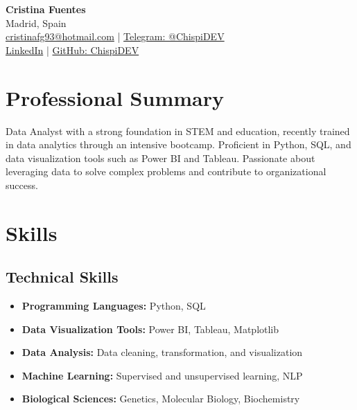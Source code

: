 \documentclass[11pt,a4paper]{article}
\begin{document}
\begin{center}
    {\Huge \textbf{\textcolor{mypurple}{Cristina Fuentes}}} \\[1mm]
    Madrid, Spain \\
    \href{mailto:cristinafg93@hotmail.com}{cristinafg93@hotmail.com} | 
    \href{https://telegram.me/ChispiDEV}{Telegram: @ChispiDEV} \\
    \href{https://www.linkedin.com/in/tu-perfil}{LinkedIn} | 
    \href{https://github.com/ChispiDEV}{GitHub: ChispiDEV} \\
\end{center}

\vspace{1em}

\section*{Professional Summary}
Data Analyst with a strong foundation in STEM and education, recently trained in data analytics through an intensive bootcamp. Proficient in Python, SQL, and data visualization tools such as Power BI and Tableau. Passionate about leveraging data to solve complex problems and contribute to organizational success.

\vspace{1em}

\section*{Skills}

\subsection*{Technical Skills}
\begin{itemize}[label=\textbullet, leftmargin=0.5cm]
    \item \textbf{Programming Languages:} Python, SQL
    \item \textbf{Data Visualization Tools:} Power BI, Tableau, Matplotlib
    \item \textbf{Data Analysis:} Data cleaning, transformation, and visualization
    \item \textbf{Machine Learning:} Supervised and unsupervised learning, NLP
    \item \textbf{Biological Sciences:} Genetics, Molecular Biology, Biochemistry
\end{itemize}
\end{document}
